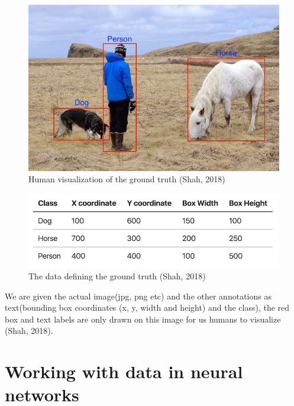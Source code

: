 \documentclass[]{article}
\begin{document}
\begin{figure}[!h]
	\includegraphics[scale=0.65]{ground}
	\caption{Human visualization of the ground truth (Shah, 2018)}
	\label{Fig:Race}
\end{figure}


\begin{figure}[!h]
	\includegraphics[scale=0.65]{ground3}
	\caption{The data defining the ground truth (Shah, 2018)}
	\label{Fig:Race}
\end{figure}

We are given the actual image(jpg, png etc) and the other annotations as text(bounding box coordinates (x, y, width and height) and the class), the red box and text labels are only drawn on this image for us humans to visualize (Shah, 2018).

\section{Working with data in neural networks}
\end{document}
